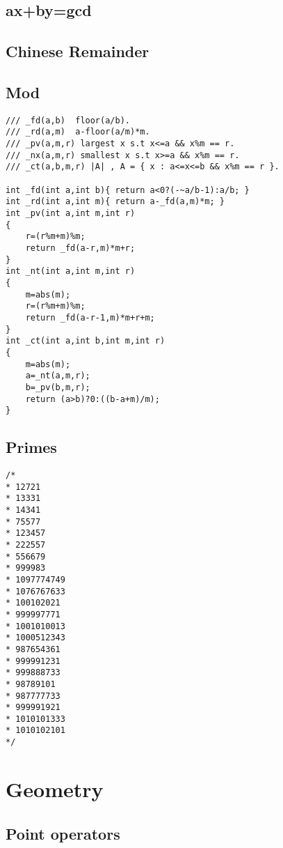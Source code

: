 \documentclass[10pt,twocolumn,oneside]{article}
\begin{document}
\subsection{ax+by=gcd}


\subsection{Chinese Remainder}


\subsection{Mod}
\begin{lstlisting}
/// _fd(a,b)  floor(a/b).
/// _rd(a,m)  a-floor(a/m)*m.
/// _pv(a,m,r) largest x s.t x<=a && x%m == r.
/// _nx(a,m,r) smallest x s.t x>=a && x%m == r.
/// _ct(a,b,m,r) |A| , A = { x : a<=x<=b && x%m == r }.

int _fd(int a,int b){ return a<0?(-~a/b-1):a/b; }
int _rd(int a,int m){ return a-_fd(a,m)*m; }
int _pv(int a,int m,int r)
{
    r=(r%m+m)%m;
    return _fd(a-r,m)*m+r;
}
int _nt(int a,int m,int r)
{
    m=abs(m);
    r=(r%m+m)%m;
    return _fd(a-r-1,m)*m+r+m;
}
int _ct(int a,int b,int m,int r)
{
    m=abs(m);
    a=_nt(a,m,r);
    b=_pv(b,m,r);
    return (a>b)?0:((b-a+m)/m);
}
\end{lstlisting}
\subsection{Primes}
\begin{lstlisting}
/*
* 12721
* 13331
* 14341
* 75577
* 123457
* 222557
* 556679
* 999983
* 1097774749
* 1076767633
* 100102021
* 999997771
* 1001010013
* 1000512343
* 987654361
* 999991231
* 999888733
* 98789101
* 987777733
* 999991921
* 1010101333
* 1010102101
*/
\end{lstlisting}
\section{Geometry}

\subsection{Point operators}

\end{document}
